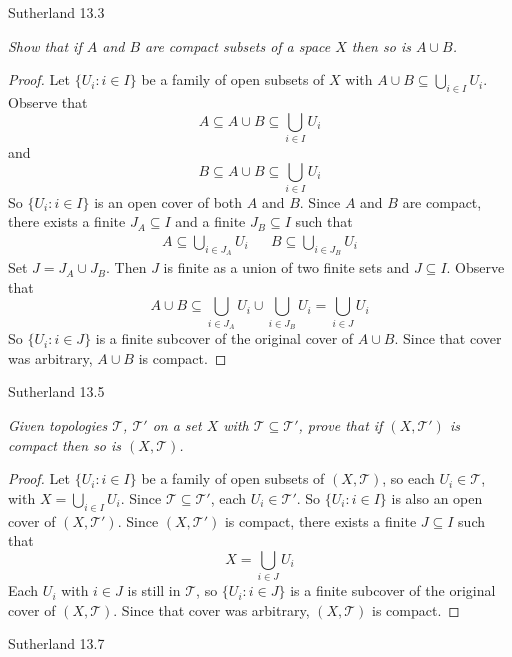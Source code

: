 \documentclass[minion]{homework}
\begin{document}
\begin{problems}

\problem Sutherland 13.3

\textit{Show that if $A$ and $B$ are compact subsets of a space $X$ then so is $A \cup B$.}
\newline
\begin{proof}
  Let $\{U_i : i \in I\}$ be a family of open subsets of $X$ with $A \cup B \subseteq \bigcup_{i \in I} U_i$. Observe that
  $$A \subseteq A \cup B \subseteq \bigcup_{i \in I} U_i$$
  and
  $$B \subseteq A \cup B \subseteq \bigcup_{i \in I} U_i$$
  So $\{U_i : i \in I\}$ is an open cover of both $A$ and $B$. Since $A$ and $B$ are compact, there exists a finite $J_A \subseteq I$ and a finite $J_B \subseteq I$ such that
  \begin{align*}
    A \subseteq \bigcup_{i \in J_A} U_i && B \subseteq \bigcup_{i \in J_B} U_i
  \end{align*}
  Set $J = J_A \cup J_B$. Then $J$ is finite as a union of two finite sets and $J \subseteq I$. Observe that
  $$A \cup B \subseteq \bigcup_{i \in J_A} U_i \cup \bigcup_{i \in J_B} U_i = \bigcup_{i \in J} U_i$$
  So $\{U_i : i \in J\}$ is a finite subcover of the original cover of $A \cup B$. Since that cover was arbitrary, $A \cup B$ is compact.
\end{proof}
\problem Sutherland 13.5

\textit{Given topologies $\mathcal{T}$, $\mathcal{T}'$ on a set $X$ with $\mathcal{T} \subseteq \mathcal{T}'$, prove that if $(X, \mathcal{T}')$ is compact then so is $(X, \mathcal{T})$.}
\newline
\begin{proof}
  Let $\{U_i : i \in I\}$ be a family of open subsets of $(X, \mathcal{T})$, so each
  $U_i \in \mathcal{T}$, with $X = \bigcup_{i \in I} U_i$.
  Since $\mathcal{T} \subseteq \mathcal{T}'$, each $U_i \in \mathcal{T}'$. So $\{U_i : i \in I\}$ is also an open cover of
  $(X, \mathcal{T}')$. Since $(X, \mathcal{T}')$ is compact, there exists a finite $J \subseteq I$ such that
  $$X = \bigcup_{i \in J} U_i$$
  Each $U_i$ with $i \in J$ is still in $\mathcal{T}$, so $\{U_i : i \in J\}$ is a finite subcover of the original cover of $(X, \mathcal{T})$.
  Since that cover was arbitrary, $(X, \mathcal{T})$ is compact.
\end{proof}
\problem Sutherland 13.7


\end{problems}
\end{document}
